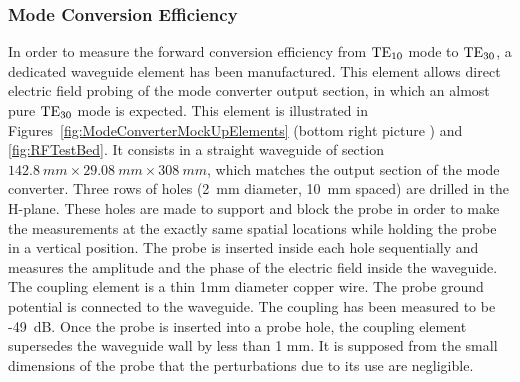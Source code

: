 {\clearpage
\subsubsection{Mode Conversion Efficiency}
In order to measure the forward conversion efficiency from ${\mathrm{TE}}_{10}$ mode to ${\mathrm{TE}}_{30}$, a dedicated waveguide element has been manufactured. This element allows direct electric field probing of the mode converter output section, in which an almost pure ${\mathrm{TE}}_{30}$ mode is expected. This element is illustrated in Figures~\ref{fig:ModeConverterMockUpElements} (bottom right picture ) and \ref{fig:RFTestBed}. It consists in a straight waveguide of section $142.8~\si{mm}\times29.08~\si{mm}\times308~\si{mm}$, which matches the output section of the mode converter. Three rows of holes (2~mm diameter, 10~mm spaced) are drilled in the H-plane. These holes are made to support and block the probe in order to make the measurements at the exactly same spatial locations while holding the probe in a vertical position. The probe is inserted inside each hole sequentially and measures the amplitude and the phase of the electric field inside the waveguide. The coupling element is a thin 1mm diameter copper wire.  The probe ground potential is connected to the waveguide. The coupling has been measured to be -49~dB. Once the probe is inserted into a probe hole, the coupling element supersedes the waveguide wall by less than 1 mm. It is supposed from the small dimensions of the probe that the perturbations due to its use are negligible.  

}
